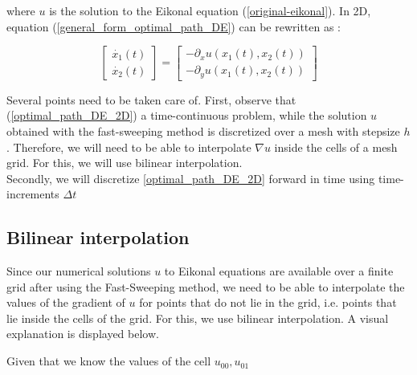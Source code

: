 \documentclass[11pt]{article}
\theoremstyle{definition}
\theoremstyle{remark}
\begin{document}
\noindent where $u$ is the solution to the Eikonal equation (\ref{original-eikonal}). In 2D, equation (\ref{general_form_optimal_path_DE}) can be rewritten as : 

\begin{equation}
\label{optimal_path_DE_2D}
    \begin{bmatrix}
        \dot{x_1}(t) \\
        \dot{x_2}(t)
    \end{bmatrix} = \begin{bmatrix}
        -\partial_xu(x_1(t),x_2(t)) \\
        -\partial_yu(x_1(t),x_2(t))
    \end{bmatrix}
\end{equation}

\noindent Several points need to be taken care of. First, observe that (\ref{optimal_path_DE_2D}) a time-continuous problem, while the solution $u$ obtained with the fast-sweeping method is discretized over a mesh with stepsize $h$. Therefore, we will need to be able to interpolate $\nabla u$ inside the cells of a mesh grid. For this, we will use bilinear interpolation.
\\
Secondly, we will discretize \ref{optimal_path_DE_2D} forward in time using time-increments $\Delta t$ 

\subsection{Bilinear interpolation}
Since our numerical solutions $u$ to Eikonal equations are available over a finite grid after using the Fast-Sweeping method, we need to be able to interpolate the values of the gradient of $u$ for points that do not lie in the grid, i.e. points that lie inside the cells of the grid. For this, we use bilinear interpolation. A visual explanation is displayed below.

Given that we know the values of the cell $u_{00},u_{01}$

\end{document}
